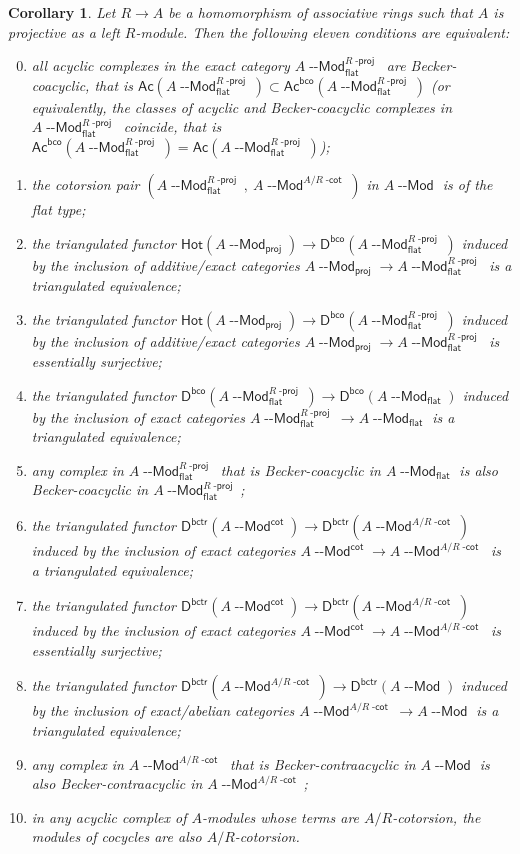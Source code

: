 \documentclass[12pt,a4paper]{amsart}
\newcommand{\+}{\nobreakdash-}
\renewcommand{\:}{\colon}
\newcommand{\rarrow}{\longrightarrow}
\newcommand{\Modl}{{\operatorname{\mathsf{--Mod}}}}
\newcommand{\sD}{\mathsf D}
\newcommand{\Hot}{\mathsf{Hot}}
\newcommand{\Ac}{\mathsf{Ac}}
\newcommand{\proj}{\mathsf{proj}}
\renewcommand{\flat}{\mathsf{flat}}
\renewcommand{\cot}{\mathsf{cot}}
\newcommand{\bco}{\mathsf{bco}}
\newcommand{\bctr}{\mathsf{bctr}}
\newcommand{\dcot}{{\operatorname{\mathsf{-cot}}}}
\newcommand{\dproj}{{\operatorname{\mathsf{-proj}}}}
\theoremstyle{plain}
\newtheorem{cor}[thm]{Corollary}
\theoremstyle{definition}
\begin{document}
\begin{cor} \label{relatively-cotorsion-conjecture-corollary}
 Let $R\rarrow A$ be a homomorphism of associative rings such that
$A$ is projective as a left $R$\+module.
 Then the following eleven conditions are equivalent:
\begin{enumerate}
\setcounter{enumi}{-1}
\item all acyclic complexes in the exact category
$A\Modl_\flat^{R\dproj}$ are Becker-coacyclic, that is\/
$\Ac(A\Modl_\flat^{R\dproj})\subset\Ac^\bco(A\Modl_\flat^{R\dproj})$
(or equivalently, the classes of acyclic and Becker-coacyclic
complexes in $A\Modl_\flat^{R\dproj}$ coincide, that is\/
$\Ac^\bco(A\Modl_\flat^{R\dproj})=\Ac(A\Modl_\flat^{R\dproj})$);
\item the cotorsion pair $(A\Modl_\flat^{R\dproj},\>A\Modl^{A/R\dcot})$
in $A\Modl$ is of the flat type;
\item the triangulated functor\/ $\Hot(A\Modl_\proj)\rarrow
\sD^\bco(A\Modl_\flat^{R\dproj})$ induced by the inclusion of
additive/exact categories $A\Modl_\proj\rarrow A\Modl_\flat^{R\dproj}$
is a triangulated equivalence;
\item the triangulated functor\/ $\Hot(A\Modl_\proj)\rarrow
\sD^\bco(A\Modl_\flat^{R\dproj})$ induced by the inclusion of
additive/exact categories $A\Modl_\proj\rarrow A\Modl_\flat^{R\dproj}$
is essentially surjective;
\item the triangulated functor\/ $\sD^\bco(A\Modl_\flat^{R\dproj})
\rarrow\sD^\bco(A\Modl_\flat)$ induced by the inclusion of exact
categories $A\Modl_\flat^{R\dproj}\rarrow A\Modl_\flat$ is
a triangulated equivalence;
\item any complex in $A\Modl_\flat^{R\dproj}$ that is Becker-coacyclic
in $A\Modl_\flat$ is also Becker-coacyclic in $A\Modl_\flat^{R\dproj}$;
\item the triangulated functor\/ $\sD^\bctr(A\Modl^\cot)\rarrow
\sD^\bctr(A\Modl^{A/R\dcot})$ induced by the inclusion of exact
categories $A\Modl^\cot\rarrow A\Modl^{A/R\dcot}$ is a triangulated
equivalence;
\item the triangulated functor\/ $\sD^\bctr(A\Modl^\cot)\rarrow
\sD^\bctr(A\Modl^{A/R\dcot})$ induced by the inclusion of exact
categories $A\Modl^\cot\rarrow A\Modl^{A/R\dcot}$ is essentially
surjective;
\item the triangulated functor\/ $\sD^\bctr(A\Modl^{A/R\dcot})\rarrow
\sD^\bctr(A\Modl)$ induced by the inclusion of exact/abelian
categories $A\Modl^{A/R\dcot}\rarrow A\Modl$ is a triangulated
equivalence;
\item any complex in $A\Modl^{A/R\dcot}$ that is Becker-contraacyclic
in $A\Modl$ is also Becker-contraacyclic in $A\Modl^{A/R\dcot}$;
\item in any acyclic complex of $A$\+modules whose terms are
$A/R$\+cotorsion, the modules of cocycles are also $A/R$\+cotorsion.
\end{enumerate}
\end{cor}
\end{document}
